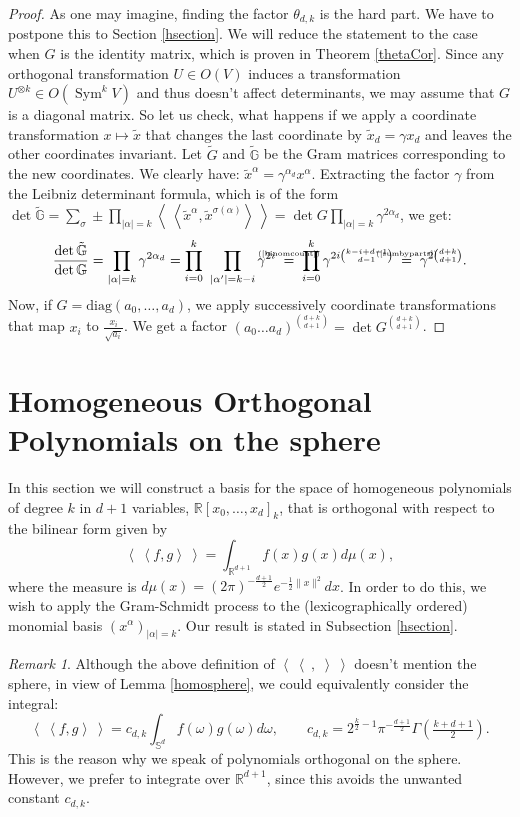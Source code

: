 \documentclass{amsart}
\DeclareMathOperator{\Sym}{Sym}
\newcommand{\bra}{\left<\!\!\!\:\left<}
\newcommand{\ket}{\right>\!\!\!\:\right>}
\newcommand{\myeq}[1]{\mathrel{\overset{\makebox[0pt]{\text{\tiny #1}}}{=}}}
\newcommand{\G}{\mathbb{G}}
\newcommand{\R}{\mathbb{R}}
\renewcommand{\S}{\mathbb{S}}
\theoremstyle{plain}
\theoremstyle{definition}
\theoremstyle{remark}
\newtheorem{remark}[theorem]{Remark}
\begin{document}
\begin{proof}
As one may imagine, finding the factor $\theta_{d,k}$ is the hard part. We have to postpone this to Section \ref{hsection}. We will reduce the statement to the case when $G$ is the identity matrix, which is proven in Theorem \ref{thetaCor}. Since any orthogonal transformation $U\in O(V)$ induces a  transformation $U^{\otimes k} \in O(\Sym^k V)$ and thus doesn't affect determinants, we may assume that $G$ is a diagonal matrix. So let us check, what happens if we apply a coordinate transformation $x\mapsto\tilde x$ that changes the last coordinate by $\tilde{x}_d = \gamma x_d$ and leaves the other coordinates invariant. Let $\tilde{G}$ and $\tilde{\G}$ be the Gram matrices corresponding to the new coordinates. We clearly have: $\tilde{x}^\alpha = \gamma^{\alpha_d} x^\alpha$. Extracting the factor $\gamma$ from the Leibniz determinant formula, which is of the form $\det \tilde{\G}=\sum\limits_\sigma\pm\prod\limits_{|\alpha|=k} \bra \tilde{x}^{\alpha},\tilde{x}^{\sigma(\alpha)}\ket=\det G\prod\limits_{|\alpha|=k} \gamma^{2\alpha_d}$, we get: 
\vspace{-2mm}
$$
\frac{\det \tilde{\G}}{\det\G} = \prod_{|\alpha|=k}\gamma^{2\alpha_d} = \prod_{i=0}^k\ \prod_{|\alpha '|=k-i} \gamma^{2i} \; \myeq{(\ref{binomcount})}\;\prod_{i=0}^k\gamma^{2i\binom{k-i+d-1}{d-1}} \; \myeq{(\ref{sumbyparts})} \; \gamma^{2\binom{d+k}{d+1}}.
$$
Now, if $G= \text{diag}\left(a_0,\ldots,a_d\right)$, we apply successively coordinate transformations that map $x_i$ to $\frac{x_i}{\sqrt{a_i}}$. We get a factor $(a_0\ldots a_d)^{\binom{d+k}{d+1}} = \det G^{\binom{d+k}{d+1}}$.
\end{proof}





\section{Homogeneous Orthogonal Polynomials on the sphere} \label{polynomialSection}
In this section we will construct a basis for the space of homogeneous polynomials of degree $k$ in $d+1$ variables, $\R[x_0,\ldots,x_d]_k$, that is orthogonal with respect to the bilinear form given by
\begin{equation} \label{spherebracket}
 \bra f,g\ket = \int_{\R^{d+1}}f(x)g(x) d\mu(x),
\end{equation}
where the measure is $d\mu(x) = (2\pi)^{-\frac{d+1}{2}}e^{-\frac{1}{2}\|x\|^2}dx$. In order to do this, we wish to apply the Gram-Schmidt process to the (lexicographically ordered) monomial basis $(x^\alpha)_{|\alpha |=k}$. Our result is stated in Subsection \ref{hsection}. 
\begin{remark}
Although the above definition of $\bra\ ,\;\ket$ doesn't mention the sphere, in view of Lemma \ref{homosphere}, we could equivalently consider the integral:
$$
 \bra f,g\ket = c_{d,k} \int_{\S^{d}}f(\omega)g(\omega) d\omega, \qquad c_{d,k} = 2^{\frac{k}{2}-1}\pi^{-\frac{d+1}{2}}\Gamma\!\left(\tfrac{k+d+1}{2}\right).
$$ 
This is the reason why we speak of polynomials orthogonal on the sphere. However, we prefer to integrate over $\R^{d+1}$, since this avoids the unwanted constant $c_{d,k}$.
\end{remark}
\end{document}
